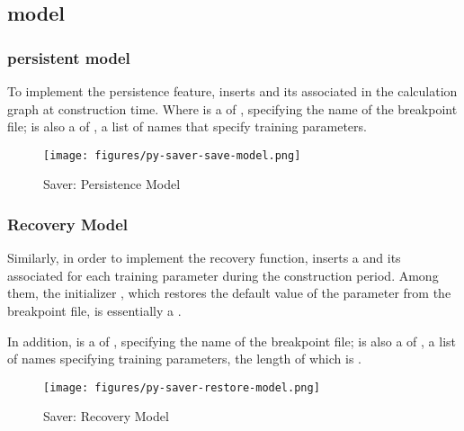 \begin{content}
\subsection{model}

\subsubsection{persistent model}

To implement the persistence feature,  inserts  and its associated  in the calculation graph at construction time. Where  is a  of , specifying the name of the breakpoint file;  is also a  of  , a list of  names that specify training parameters.

\begin{figure}[!htbp]
\centering
\texttt{[image: figures/py-saver-save-model.png]}
\caption{Saver: Persistence Model}
 \label{fig:py-saver-save-model}
\end{figure}

\subsubsection{Recovery Model}

Similarly, in order to implement the recovery function,  inserts a  and its associated  for each training parameter during the construction period. Among them, the initializer , which restores the default value of the parameter from the breakpoint file, is essentially a .

In addition,  is a  of , specifying the name of the breakpoint file;  is also a  of  , a list of  names specifying training parameters, the length of which is .

\begin{figure}[!htbp]
\centering
\texttt{[image: figures/py-saver-restore-model.png]}
\caption{Saver: Recovery Model}
 \label{fig:py-saver-restore-model}
\end{figure}

\end{content}